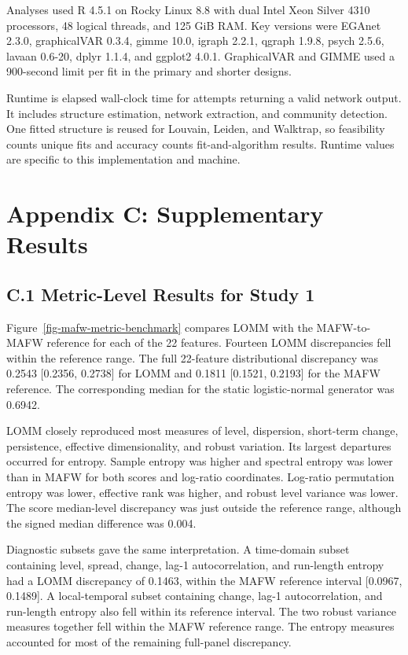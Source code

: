 \documentclass[
]{article}
\begin{document}
Analyses used R 4.5.1 on Rocky Linux 8.8 with dual Intel Xeon Silver
4310 processors, 48 logical threads, and 125 GiB RAM. Key versions were
EGAnet 2.3.0, graphicalVAR 0.3.4, gimme 10.0, igraph 2.2.1, qgraph
1.9.8, psych 2.5.6, lavaan 0.6-20, dplyr 1.1.4, and ggplot2 4.0.1.
GraphicalVAR and GIMME used a 900-second limit per fit in the primary
and shorter designs.

Runtime is elapsed wall-clock time for attempts returning a valid
network output. It includes structure estimation, network extraction,
and community detection. One fitted structure is reused for Louvain,
Leiden, and Walktrap, so feasibility counts unique fits and accuracy
counts fit-and-algorithm results. Runtime values are specific to this
implementation and machine.

\section{Appendix C: Supplementary
Results}\label{appendix-c-supplementary-results}

\setcounter{table}{0}
\renewcommand{\thetable}{C\arabic{table}}
\setcounter{figure}{0}
\renewcommand{\thefigure}{C\arabic{figure}}

\subsection{C.1 Metric-Level Results for Study
1}\label{c.1-metric-level-results-for-study-1}

Figure~\ref{fig-mafw-metric-benchmark} compares LOMM with the
MAFW-to-MAFW reference for each of the 22 features. Fourteen LOMM
discrepancies fell within the reference range. The full 22-feature
distributional discrepancy was 0.2543 {[}0.2356, 0.2738{]} for LOMM and
0.1811 {[}0.1521, 0.2193{]} for the MAFW reference. The corresponding
median for the static logistic-normal generator was 0.6942.

LOMM closely reproduced most measures of level, dispersion, short-term
change, persistence, effective dimensionality, and robust variation. Its
largest departures occurred for entropy. Sample entropy was higher and
spectral entropy was lower than in MAFW for both scores and log-ratio
coordinates. Log-ratio permutation entropy was lower, effective rank was
higher, and robust level variance was lower. The score median-level
discrepancy was just outside the reference range, although the signed
median difference was 0.004.

Diagnostic subsets gave the same interpretation. A time-domain subset
containing level, spread, change, lag-1 autocorrelation, and run-length
entropy had a LOMM discrepancy of 0.1463, within the MAFW reference
interval {[}0.0967, 0.1489{]}. A local-temporal subset containing
change, lag-1 autocorrelation, and run-length entropy also fell within
its reference interval. The two robust variance measures together fell
within the MAFW reference range. The entropy measures accounted for most
of the remaining full-panel discrepancy.
\end{document}
